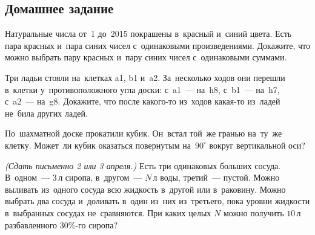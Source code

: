 

\subsection*{Домашнее задание}



\begin{problems}

\item
Натуральные числа от~1 до~2015 покрашены в~красный и~синий цвета.
Есть пара красных и~пара синих чисел с~одинаковыми произведениями.
Докажите, что можно выбрать пару красных и~пару синих чисел с~одинаковыми
суммами.

Три ладьи стояли на~клетках \textsf{a1}, \textsf{b1} и~\textsf{a2}.
За~несколько ходов они перешли в~клетки у~противоположного угла доски:
с~\textsf{a1}~--- на~\textsf{h8},
с~\textsf{b1}~--- на~\textsf{h7},
с~\textsf{a2}~--- на~\textsf{g8}.
Докажите, что после какого-то из~ходов какая-то из~ладей не~била других ладей.

\item
По~шахматной доске прокатили кубик.
Он~встал той~же гранью на~ту~же клетку.
Может~ли кубик оказаться повернутым на~$90^\circ$ вокруг вертикальной оси?


\item
\emph{(Сдать письменно 2 или 3 апреля.)}
Есть три одинаковых больших сосуда.
В~одном~--- $3 \, \text{л}$ сиропа, в~другом~--- $N \, \text{л}$ воды,
третий~--- пустой.
Можно выливать из~одного сосуда всю жидкость в~другой или в~раковину.
Можно выбрать два сосуда и~доливать в~один из~них из~третьего, пока уровни
жидкости в~выбранных сосудах не~сравняются.
При каких целых $N$ можно получить $10 \, \text{л}$ разбавленного $30\%$-го
сиропа?

\end{problems}

